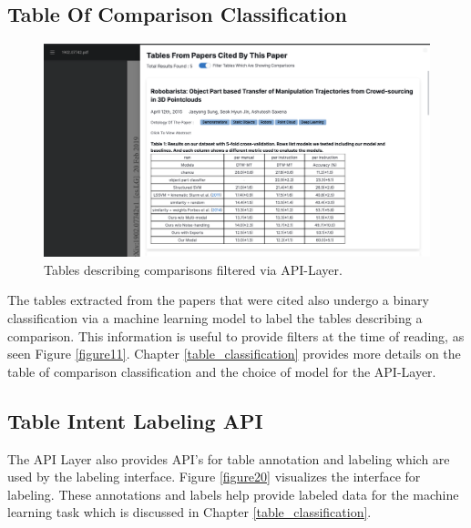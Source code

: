 \subsection{Table Of Comparison Classification}
\begin{figure}[h]
    \centering
    \includegraphics[width=\maxwidth{\textwidth}]{src/images/classification_exp.png}
    \caption{Tables describing comparisons filtered via API-Layer. }
    \label{figure\arabic{figurecounter}}
\end{figure}

The tables extracted from the papers that were cited also undergo a binary classification via a machine learning model to label the tables describing a comparison. This information is useful to provide filters at the time of reading, as seen Figure \ref{figure11}. Chapter \ref{table_classification} provides more details on the table of comparison classification and the choice of model for the API-Layer.
 
\subsection{Table Intent Labeling API}
The API Layer also provides API's for table annotation and labeling which are used by the labeling interface. Figure \ref{figure20} visualizes the interface for labeling. These annotations and labels help provide labeled data for the machine learning task which is discussed in Chapter \ref{table_classification}.